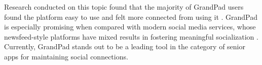 Research conducted on this topic found that the majority of GrandPad users found
    the platform easy to use and felt more connected from using it
    \cite{grandpad_feasability}.
GrandPad is especially promising when compared with modern social media services,
    whose newsfeed-style platforms have mixed results in fostering meaningful
    socialization \cite{longjing}.
Currently, GrandPad stands out to be a leading tool in the category of senior
    apps for maintaining social connections.
